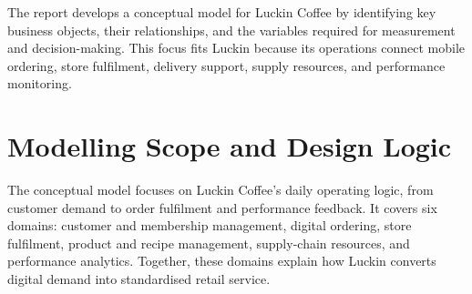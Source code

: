\documentclass[12pt,a4paper]{article}
\begin{document}
The report develops a conceptual model for Luckin Coffee by identifying key business objects, their relationships, and the variables required for measurement and decision-making. This focus fits Luckin because its operations connect mobile ordering, store fulfilment, delivery support, supply resources, and performance monitoring.

\section{Modelling Scope and Design Logic}

The conceptual model focuses on Luckin Coffee's daily operating logic, from customer demand to order fulfilment and performance feedback. It covers six domains: customer and membership management, digital ordering, store fulfilment, product and recipe management, supply-chain resources, and performance analytics. Together, these domains explain how Luckin converts digital demand into standardised retail service.
\end{document}

